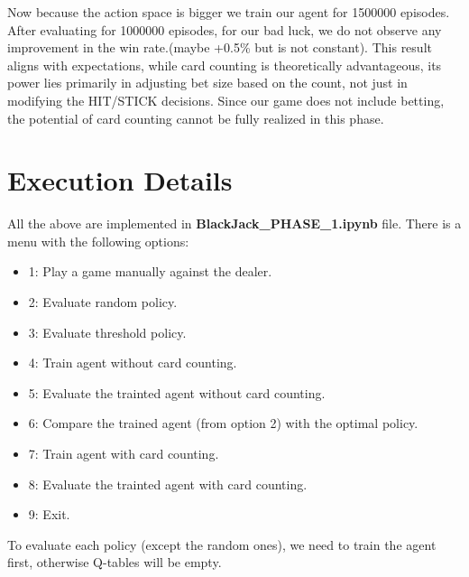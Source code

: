 \documentclass{article}
\begin{document}
\noindent Now because the action space is bigger we train our agent for 1500000 episodes. After
evaluating for 1000000 episodes, for our bad luck, we do not observe
any improvement in the win rate.(maybe +0.5\% but is not constant).
This result aligns with expectations, while card counting is 
theoretically advantageous, its power lies primarily in adjusting
bet size based on the count, not just in modifying the HIT/STICK 
decisions. Since our game does not include betting, the 
potential of card counting cannot be fully realized in this phase.\\



\section*{Execution Details}

\noindent All the above are implemented in {\bf BlackJack\_PHASE\_1.ipynb} file.
There is a menu with the following options:

\begin{itemize}
    \item 1: Play a game manually against the dealer.
    \item 2: Evaluate random policy.
    \item 3: Evaluate threshold policy.
    \item 4: Train agent without card counting.
    \item 5: Evaluate the trainted agent without card counting.
    \item 6: Compare the trained agent (from option 2) with the optimal policy.
    \item 7: Train agent with card counting.
    \item 8: Evaluate the trainted agent with card counting.
    \item 9: Exit.
\end{itemize} 

\noindent To evaluate each policy (except the random ones), we need to train the agent first, otherwise Q-tables will be empty.
\end{document}
